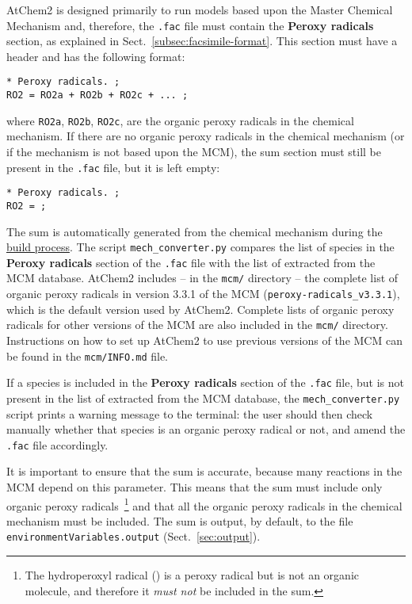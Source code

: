 AtChem2 is designed primarily to run models based upon the Master
Chemical Mechanism and, therefore, the \texttt{.fac} file must contain
the \textbf{Peroxy radicals} section, as explained in
Sect.~\ref{subsec:facsimile-format}. This section must have a header
and has the following format:

\begin{verbatim}
* Peroxy radicals. ;
RO2 = RO2a + RO2b + RO2c + ... ;
\end{verbatim}

where \texttt{RO2a}, \texttt{RO2b}, \texttt{RO2c}, are the organic
peroxy radicals in the chemical mechanism. If there are no organic
peroxy radicals in the chemical mechanism (or if the mechanism is not
based upon the MCM), the  sum section must still be present in
the \texttt{.fac} file, but it is left empty:

\begin{verbatim}
* Peroxy radicals. ;
RO2 = ;
\end{verbatim}

The  sum is automatically generated from the chemical
mechanism during the \hyperref[subsec:build-process]{build process}.
The script \texttt{mech\_converter.py} compares the list of species in
the \textbf{Peroxy radicals} section of the \texttt{.fac} file with the
list of  extracted from the MCM database. AtChem2 includes --
in the \texttt{mcm/} directory -- the complete list of organic peroxy
radicals in version 3.3.1 of the MCM (\texttt{peroxy-radicals\_v3.3.1}),
which is the default version used by AtChem2. Complete lists of
organic peroxy radicals for other versions of the MCM are also
included in the \texttt{mcm/} directory. Instructions on how to set up
AtChem2 to use previous versions of the MCM can be found in the
\texttt{mcm/INFO.md} file.

If a species is included in the \textbf{Peroxy radicals} section of the
\texttt{.fac} file, but is not present in the list of 
extracted from the MCM database, the \texttt{mech\_converter.py}
script prints a warning message to the terminal: the user should then
check manually whether that species is an organic peroxy radical or
not, and amend the \texttt{.fac} file accordingly.

It is important to ensure that the  sum is accurate, because
many reactions in the MCM depend on this parameter. This means that
the  sum must include only organic peroxy
radicals~\footnote{The hydroperoxyl radical () is a peroxy
  radical but is not an organic molecule, and therefore it
  \emph{must not} be included in the  sum.} and that all
the organic peroxy radicals in the chemical mechanism must be
included. The  sum is output, by default, to the file
\texttt{environmentVariables.output} (Sect.~\ref{sec:output}).

